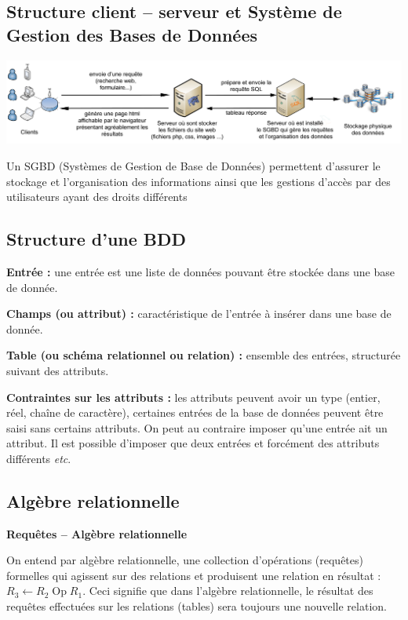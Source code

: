 \documentclass[10pt,fleqn]{article} %
\begin{document}

\vspace{2cm}
\pagestyle{fancy}
\thispagestyle{plain}


\subsection*{Structure client -- serveur et Système de Gestion des Bases de Données}

\begin{center}
\includegraphics[width=.9\textwidth]{images/bdd}
\end{center}
Un SGBD (Systèmes de Gestion de Base de Données) permettent d'assurer le stockage et l'organisation des informations ainsi que les gestions d'accès par des utilisateurs ayant des droits différents

\subsection*{Structure d'une BDD}
\begin{defi}
\textbf{Entrée :} une entrée est une liste de données pouvant être stockée dans une base de donnée. 

\textbf{Champs (ou attribut) :} caractéristique de l'entrée à insérer dans une base de donnée. 

\textbf{Table (ou schéma relationnel ou relation) :} ensemble des entrées, structurée suivant des attributs.

\textbf{Contraintes sur les attributs : } les attributs peuvent avoir un type (entier, réel, chaîne de caractère), certaines entrées de la base de données peuvent être saisi sans certains attributs. On peut au contraire imposer qu'une entrée ait un attribut. Il est possible d'imposer que deux entrées et forcément des attributs différents \textit{etc}.
\end{defi}


\subsection*{Algèbre relationnelle}


\begin{defi}
\textbf{Requêtes -- Algèbre relationnelle}

On entend par algèbre relationnelle, une collection d'opérations (requêtes) formelles qui agissent sur des relations et produisent une relation en résultat : $R_3 \leftarrow R_2 \;  \text{Op} \;  R_1$. Ceci signifie que dans l'algèbre relationnelle, le résultat des requêtes effectuées sur les relations (tables) sera toujours une nouvelle relation. 
\end{defi}
\end{document}
